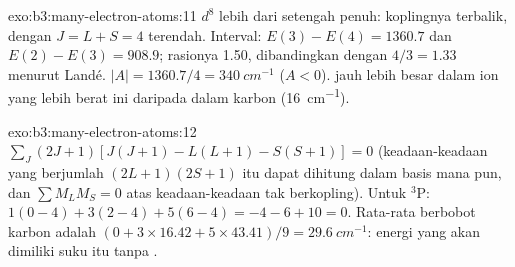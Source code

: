 \begin{solution}{exo:b3:many-electron-atoms:11}
$d^8$ lebih dari setengah penuh: koplingnya terbalik, dengan $J = L + S = 4$
terendah. Interval: $E(3) - E(4) = 1360.7$ dan $E(2) - E(3) = 908.9$; rasionya
1.50, dibandingkan dengan $4/3 = 1.33$ menurut Landé. $|A| = 1360.7/4 = \qty{340}{cm^{-1}}$
($A < 0$).  jauh lebih besar dalam ion yang lebih berat ini
daripada dalam karbon (\qty{16}{cm^{-1}}).
\end{solution}

\begin{solution}{exo:b3:many-electron-atoms:12}
$\sum_J(2J+1)[J(J+1) - L(L+1) - S(S+1)] = 0$ (keadaan-keadaan yang berjumlah $(2L+1)(2S+1)$
itu dapat dihitung dalam basis mana pun, dan $\sum M_LM_S = 0$ atas
keadaan-keadaan tak berkopling). Untuk ${}^3$P: $1(0 - 4) + 3(2 - 4) + 5(6 - 4) = -4 - 6 + 10 = 0$.
Rata-rata berbobot karbon adalah $(0 + 3 \times 16.42 + 5 \times 43.41)/9 = \qty{29.6}{cm^{-1}}$:
energi yang akan dimiliki suku itu tanpa .
\end{solution}

